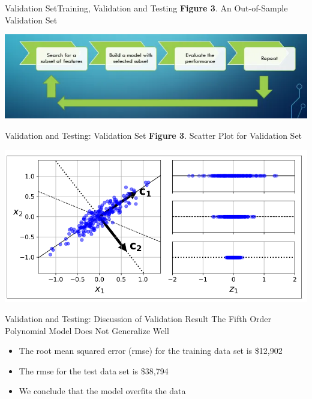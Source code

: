\documentclass[11pt]{beamer}
\begin{document}
\begin{frame}{Validation Set}{Training, Validation and Testing}
\textbf {Figure 3}. An Out-of-Sample Validation Set
	\begin{center}
	\includegraphics[scale=.6]{../05-pictures/lesson-2-2_pic_4.png}
	\end{center}
\end{frame}
\begin{frame}{Validation and Testing: Validation Set}
\textbf{Figure 3}. Scatter Plot for Validation Set
	\begin{center}
	\includegraphics[scale=.5]{../05-pictures/lesson-2-2_pic_5.png}
	\end{center}
\end{frame}
\begin{frame} {Validation and Testing: Discussion of Validation Result}
The Fifth Order Polynomial Model Does Not Generalize Well
	\begin{itemize}
		\item The root mean squared error (rmse) for the training      data set is \$12,902
		\item  The rmse for the test data set is \$38,794
		\item   We conclude that the model overfits the data
	\end{itemize}
\end{frame}
\end{document}

